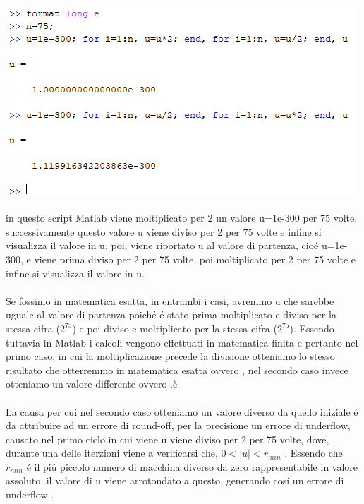 \includegraphics[width=1\linewidth]{img/ex3}
\\~\\
\noindent  in questo script Matlab viene moltiplicato per 2 un valore u=1e-300 per 75 volte, successivamente questo valore u viene diviso per 2 per 75 volte e infine si visualizza il valore in u, poi, viene riportato u al valore di partenza, cio\'e u=1e-300, e viene prima diviso per 2 per 75 volte, poi moltiplicato per 2 per 75 volte  e infine si visualizza il valore in u.
\\~\\
\noindent Se fossimo in matematica esatta, in entrambi i casi, avremmo u che sarebbe uguale al valore di partenza poich\'e \'e stato prima moltiplicato e diviso per la stessa cifra ($2^{75}$) e poi diviso e moltiplicato per la stessa cifra ($2^{75}$). Essendo tuttavia in Matlab i calcoli vengono effettuati in matematica finita e pertanto nel primo caso, in cui la moltiplicazione precede la divisione otteniamo lo stesso risultato che otterremmo in matematica esatta ovvero , nel secondo caso invece otteniamo un valore differente ovvero .è
\\~\\
\noindent La causa per cui nel secondo caso otteniamo un valore diverso da quello iniziale \'e da attribuire ad un errore di round-off, per la precisione un errore di underflow, causato nel primo ciclo in cui viene u viene diviso per 2 per 75 volte, dove, durante una delle iterzioni viene a verificarsi che, $0 < \left | u \right |< r_{min}$ . Essendo che $ r_{min}$ \'e il pi\'u piccolo numero di macchina diverso da zero rappresentabile in valore assoluto, il valore di u viene arrotondato a questo, generando cos\'i un errore di underflow .
\newline
\newline